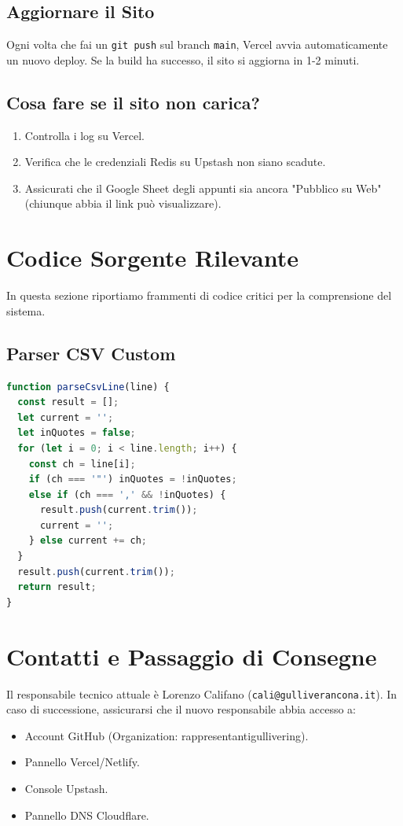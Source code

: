 \documentclass[11pt,a4paper,oneside]{book}
\begin{document}
\section{Aggiornare il Sito}
Ogni volta che fai un \texttt{git push} sul branch \texttt{main}, Vercel avvia automaticamente un nuovo deploy. Se la build ha successo, il sito si aggiorna in 1-2 minuti.

\section{Cosa fare se il sito non carica?}
\begin{enumerate}
    \item Controlla i log su Vercel.
    \item Verifica che le credenziali Redis su Upstash non siano scadute.
    \item Assicurati che il Google Sheet degli appunti sia ancora "Pubblico su Web" (chiunque abbia il link può visualizzare).
\end{enumerate}

\appendix
\chapter{Codice Sorgente Rilevante}
In questa sezione riportiamo frammenti di codice critici per la comprensione del sistema.
\section{Parser CSV Custom}
\begin{lstlisting}[language=javascript]
function parseCsvLine(line) {
  const result = [];
  let current = '';
  let inQuotes = false;
  for (let i = 0; i < line.length; i++) {
    const ch = line[i];
    if (ch === '"') inQuotes = !inQuotes;
    else if (ch === ',' && !inQuotes) {
      result.push(current.trim());
      current = '';
    } else current += ch;
  }
  result.push(current.trim());
  return result;
}
\end{lstlisting}

\chapter{Contatti e Passaggio di Consegne}
Il responsabile tecnico attuale è Lorenzo Califano (\texttt{cali@gulliverancona.it}). In caso di successione, assicurarsi che il nuovo responsabile abbia accesso a:
\begin{itemize}
    \item Account GitHub (Organization: rappresentantigullivering).
    \item Pannello Vercel/Netlify.
    \item Console Upstash.
    \item Pannello DNS Cloudflare.
\end{itemize}
\end{document}
